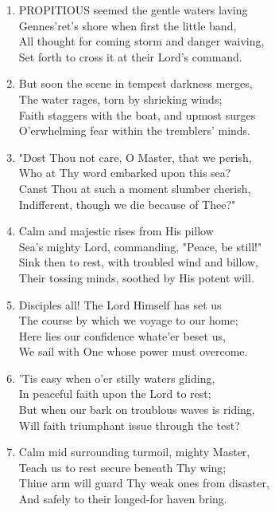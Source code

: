\documentclass[11pt,a4paper]{article}
\begin{document}
\begin{enumerate}
    \item PROPITIOUS seemed the gentle waters laving \\
            Gennes'ret's shore when first the little band, \\
        All thought for coming storm and danger waiving, \\
            Set forth to cross it at their Lord's command.

    \item But soon the scene in tempest darkness merges, \\
            The water rages, torn by shrieking winds; \\
        Faith staggers with the boat, and upmost surges \\
            O'erwhelming fear within the tremblers' minds.

    \item "Dost Thou not care, O Master, that we perish, \\
            Who at Thy word embarked upon this sea? \\
        Canst Thou at such a moment slumber cherish, \\
            Indifferent, though we die because of Thee?"

    \item Calm and majestic rises from His pillow \\
            Sea's mighty Lord, commanding, "Peace, be still!" \\
        Sink then to rest, with troubled wind and billow, \\
            Their tossing minds, soothed by His potent will.

    \item Disciples all! The Lord Himself has set us \\
            The course by which we voyage to our home; \\
        Here lies our confidence whate'er beset us, \\
            We sail with One whose power must overcome.

    \item 'Tis easy when o'er stilly waters gliding, \\
            In peaceful faith upon the Lord to rest; \\
        But when our bark on troublous waves is riding, \\
            Will faith triumphant issue through the test?

    \item Calm mid surrounding turmoil, mighty Master, \\
            Teach us to rest secure beneath Thy wing; \\
        Thine arm will guard Thy weak ones from disaster, \\
            And safely to their longed-for haven bring.

\end{enumerate}
\end{document}
